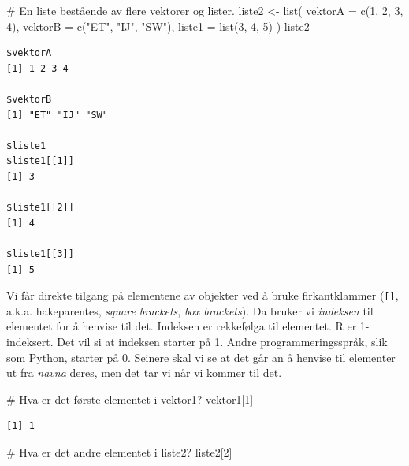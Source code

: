 \documentclass[
  letterpaper,
  DIV=11,
  numbers=noendperiod]{scrartcl}
\newenvironment{Shaded}{\begin{snugshade}}{\end{snugshade}}
\newcommand{\AttributeTok}[1]{\textcolor[rgb]{0.40,0.45,0.13}{#1}}
\newcommand{\CommentTok}[1]{\textcolor[rgb]{0.37,0.37,0.37}{#1}}
\newcommand{\DecValTok}[1]{\textcolor[rgb]{0.68,0.00,0.00}{#1}}
\newcommand{\FunctionTok}[1]{\textcolor[rgb]{0.28,0.35,0.67}{#1}}
\newcommand{\NormalTok}[1]{\textcolor[rgb]{0.00,0.23,0.31}{#1}}
\newcommand{\OtherTok}[1]{\textcolor[rgb]{0.00,0.23,0.31}{#1}}
\newcommand{\StringTok}[1]{\textcolor[rgb]{0.13,0.47,0.30}{#1}}
\begin{document}
\begin{Shaded}
\begin{Highlighting}[]
\CommentTok{\# En liste bestående av flere vektorer og lister. }
\NormalTok{liste2 }\OtherTok{\textless{}{-}} \FunctionTok{list}\NormalTok{(}
  \AttributeTok{vektorA =} \FunctionTok{c}\NormalTok{(}\DecValTok{1}\NormalTok{, }\DecValTok{2}\NormalTok{, }\DecValTok{3}\NormalTok{, }\DecValTok{4}\NormalTok{),}
  \AttributeTok{vektorB =} \FunctionTok{c}\NormalTok{(}\StringTok{"ET"}\NormalTok{, }\StringTok{"IJ"}\NormalTok{, }\StringTok{"SW"}\NormalTok{), }
  \AttributeTok{liste1 =} \FunctionTok{list}\NormalTok{(}\DecValTok{3}\NormalTok{, }\DecValTok{4}\NormalTok{, }\DecValTok{5}\NormalTok{)}
\NormalTok{)}
\NormalTok{liste2}
\end{Highlighting}
\end{Shaded}

\begin{verbatim}
$vektorA
[1] 1 2 3 4

$vektorB
[1] "ET" "IJ" "SW"

$liste1
$liste1[[1]]
[1] 3

$liste1[[2]]
[1] 4

$liste1[[3]]
[1] 5
\end{verbatim}

Vi får direkte tilgang på elementene av objekter ved å bruke
firkantklammer (\texttt{{[}{]}}, a.k.a. hakeparentes, \emph{square
brackets}, \emph{box brackets}). Da bruker vi \emph{indeksen} til
elementet for å henvise til det. Indeksen er rekkefølga til elementet. R
er 1-indeksert. Det vil si at indeksen starter på 1. Andre
programmeringsspråk, slik som Python, starter på 0. Seinere skal vi se
at det går an å henvise til elementer ut fra \emph{navna} deres, men det
tar vi når vi kommer til det.

\begin{Shaded}
\begin{Highlighting}[]
\CommentTok{\# Hva er det første elementet i vektor1?}
\NormalTok{vektor1[}\DecValTok{1}\NormalTok{]}
\end{Highlighting}
\end{Shaded}

\begin{verbatim}
[1] 1
\end{verbatim}

\begin{Shaded}
\begin{Highlighting}[]
\CommentTok{\# Hva er det andre elementet i liste2?}
\NormalTok{liste2[}\DecValTok{2}\NormalTok{]}
\end{Highlighting}
\end{Shaded}
\end{document}

